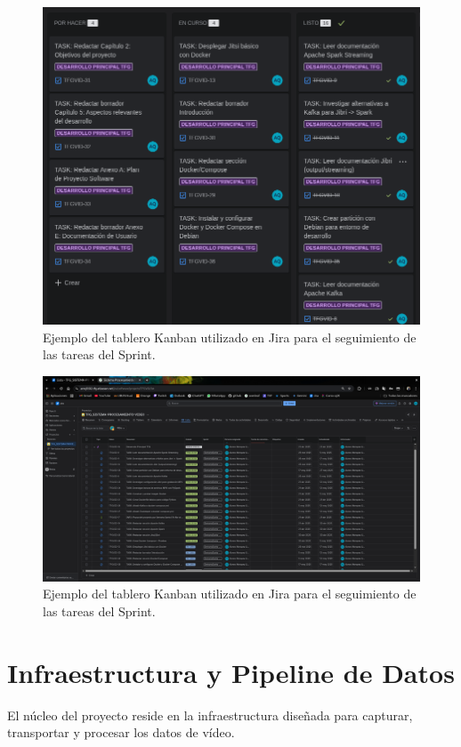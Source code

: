 \begin{figure}[H]
    \centering
    \includegraphics[width=\textwidth]{img/jira.png}
    \caption{Ejemplo del tablero Kanban utilizado en Jira para el seguimiento de las tareas del Sprint.}
    \label{fig:tablero_jira}
\end{figure}

\begin{figure}[H]
    \centering
    \includegraphics[width=\textwidth]{img/jira (2).png}
    \caption{Ejemplo del tablero Kanban utilizado en Jira para el seguimiento de las tareas del Sprint.}
    \label{fig: Jira ejemplo doc}
\end{figure}

\section{Infraestructura y Pipeline de Datos}
\label{sec:herramientas_infraestructura}
El núcleo del proyecto reside en la infraestructura diseñada para capturar, transportar y procesar los datos de vídeo.

